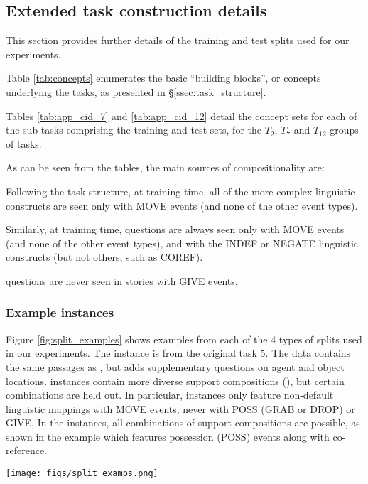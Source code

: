 \subsection{Extended task construction details}
\label{ssec:ext_task_details}

This section provides further details of the training and test splits used for our experiments. 

Table \ref{tab:concepts} enumerates the basic ``building blocks'', or concepts underlying the tasks, as presented in \S\ref{ssec:task_structure}.

Tables \ref{tab:app_cid_7} and \ref{tab:app_cid_12} detail the concept sets for each of the sub-tasks comprising the training and test sets, for the $T_2$, $T_7$ and $T_{12}$ groups of tasks.



As can be seen from the tables, the main sources of compositionality are:
\begin{compactitem}
    \item Following the \babibm task structure, at training time, all of the more complex linguistic constructs are seen only with MOVE events (and none of the other event types).
    \item Similarly, at training time, \yesno questions are always seen only with MOVE events (and none of the other event types), and with the INDEF or NEGATE linguistic constructs (but not others, such as COREF).
    \item \wherewaso questions are never seen in stories with GIVE events.
\end{compactitem}


\subsubsection{Example instances}
Figure \ref{fig:split_examples} shows examples from each of the 4 types of splits used in our experiments. The \concatnarg instance is from the original \babibm task 5. The \injectnarg data contains the same passages as \concatnarg, but adds supplementary questions on agent and object locations. \diversenarg instances contain more diverse support compositions (\suppcomp), but certain combinations are held out. In particular, \diversenarg instances only feature non-default linguistic mappings with MOVE events, never with POSS (GRAB or DROP) or GIVE. In the \mixnarg instances, all combinations of support compositions are possible, as shown in the example which features possession (POSS) events along with co-reference.
\begin{figure*}[]
\centering
\texttt{[image: figs/split\_examps.png]}

\caption{\label{fig:split_examples} Example instances from each of the 4 types of splits used in our experiments.}
\end{figure*}



